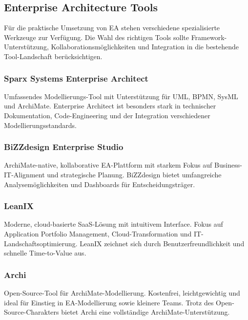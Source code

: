 \subsection{Enterprise Architecture Tools}
\label{subsec:tools}

Für die praktische Umsetzung von EA stehen verschiedene spezialisierte Werkzeuge zur Verfügung. Die Wahl des richtigen Tools sollte Framework-Unterstützung, Kollaborationsmöglichkeiten und Integration in die bestehende Tool-Landschaft berücksichtigen.

\subsubsection{Sparx Systems Enterprise Architect}
\label{subsubsec:sparx}

Umfassendes Modellierungs-Tool mit Unterstützung für UML, BPMN, SysML und ArchiMate. Enterprise Architect ist besonders stark in technischer Dokumentation, Code-Engineering und der Integration verschiedener Modellierungsstandards.

\subsubsection{BiZZdesign Enterprise Studio}
\label{subsubsec:bizzdesign}

ArchiMate-native, kollaborative EA-Plattform mit starkem Fokus auf Business-IT-Alignment und strategische Planung. BiZZdesign bietet umfangreiche Analysemöglichkeiten und Dashboards für Entscheidungsträger.

\subsubsection{LeanIX}
\label{subsubsec:leanix}

Moderne, cloud-basierte SaaS-Lösung mit intuitivem Interface. Fokus auf Application Portfolio Management, Cloud-Transformation und IT-Landschaftsoptimierung. LeanIX zeichnet sich durch Benutzerfreundlichkeit und schnelle Time-to-Value aus.

\subsubsection{Archi}
\label{subsubsec:archi}

Open-Source-Tool für ArchiMate-Modellierung. Kostenfrei, leichtgewichtig und ideal für Einstieg in EA-Modellierung sowie kleinere Teams. Trotz des Open-Source-Charakters bietet Archi eine vollständige ArchiMate-Unterstützung.

